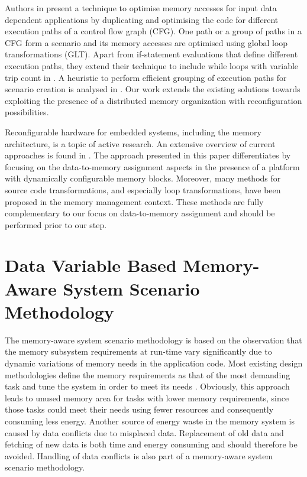 Authors in \cite{Pal06} present a technique to optimise memory accesses for input data dependent applications by duplicating and optimising the code for different execution paths of a control flow graph (CFG). 
One path or a group of paths in a CFG form a scenario and its memory accesses are optimised using global loop transformations (GLT). 
Apart from if-statement evaluations that define different execution paths, they extend their technique to include while loops with variable trip count in \cite{Pal06b}. 
A heuristic to perform efficient grouping of execution paths for scenario creation is analysed in \cite{Pal07}. 
Our work extends the existing solutions towards exploiting the presence of a distributed memory organization with reconfiguration possibilities.

Reconfigurable hardware for embedded systems, including the memory architecture, is a topic of active research. 
An extensive overview of current approaches is found in \cite{Garcia}. 
The approach presented in this paper differentiates by focusing on the data-to-memory assignment aspects in the presence of a platform with dynamically configurable memory blocks. 
Moreover, many methods for source code transformations, and especially loop transformations, have been proposed in the memory management context. 
These methods are fully complementary to our focus on data-to-memory assignment and should be performed prior to our step. 

\section{Data Variable Based Memory-Aware System Scenario Methodology}
\label{sec:methodologyC}

The memory-aware system scenario methodology is based on the observation that the memory subsystem requirements at run-time vary significantly due to dynamic variations of memory needs in the application code. 
Most existing design methodologies define the memory requirements as that of the most demanding task and tune the system in order to meet its needs \cite{tcm}. 
Obviously, this approach leads to unused memory area for tasks with lower memory requirements, since those tasks could meet their needs using fewer resources and consequently consuming less energy. 
Another source of energy waste in the memory system is caused by data conflicts due to misplaced data. 
Replacement of old data and fetching of new data is both time and energy consuming and should therefore be avoided. 
Handling of data conflicts is also part of a memory-aware system scenario methodology.

